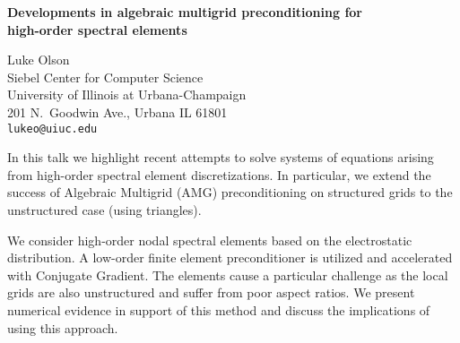 \documentclass{report}
\begin{document}

\begin{center}
{\large
{\bf Developments in algebraic multigrid preconditioning for \\
	high-order spectral elements}}

	Luke Olson \\
	Siebel Center for Computer Science \\
	University of Illinois at
	Urbana-Champaign \\ 201 N.~Goodwin Ave., Urbana IL 61801 \\
	{\tt lukeo@uiuc.edu}
\end{center}
In this talk we highlight recent attempts to solve systems
of equations arising from high-order spectral element
discretizations. In particular, we extend the success of
Algebraic Multigrid (AMG) preconditioning on structured
grids to the unstructured case (using triangles).

 We
consider high-order nodal spectral elements based on the
electrostatic distribution. A low-order finite element
preconditioner is utilized and accelerated with Conjugate
Gradient. The elements cause a particular challenge as the
local grids are also unstructured and suffer from poor
aspect ratios. We present numerical evidence in support of
this method and discuss the implications of using this
approach.



\end{document}
